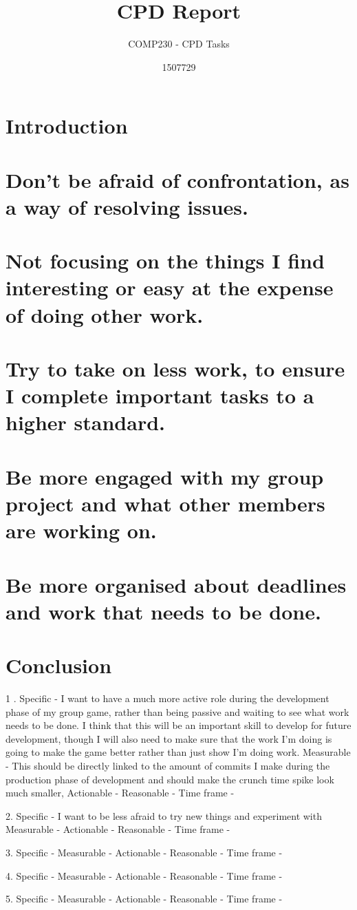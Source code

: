 \documentclass{scrartcl}
\title{CPD Report}
\subtitle{COMP230 - CPD Tasks}
\author{1507729}
\begin{document}
\maketitle

\section*{Introduction}


\section{Don't be afraid of confrontation, as a way of resolving issues.}

\section{Not focusing on the things I find interesting or easy at the expense of doing other work.}

\section{Try to take on less work, to ensure I complete important tasks to a higher standard.}

\section{Be more engaged with my group project and what other members are working on.}

\section{Be more organised about deadlines and work that needs to be done.}

\section*{Conclusion}


1 .
Specific - I want to have a much more active role during the development phase of my group game, rather than being passive and waiting to see what work needs to be done. I think that this will be an important skill to develop for future development, though I will also need to make sure that the work I'm doing is going to make the game better rather than just show I'm doing work.
Measurable - This should be directly linked to the amount of commits I make during the production phase of development and should make the crunch time spike look much smaller,
Actionable -
Reasonable - 
Time frame - 

2. 
Specific - I want to be less afraid to try new things and experiment with 
Measurable - 
Actionable -
Reasonable - 
Time frame - 

3.
Specific -
Measurable - 
Actionable -
Reasonable - 
Time frame - 

4.
Specific -
Measurable - 
Actionable -
Reasonable - 
Time frame - 

5.
Specific -
Measurable - 
Actionable -
Reasonable - 
Time frame - 
\end{document}
